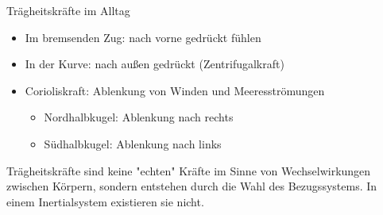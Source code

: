 \begin{example2}{Trägheitskräfte im Alltag}
    \begin{itemize}
        \item Im bremsenden Zug: nach vorne gedrückt fühlen
        \item In der Kurve: nach außen gedrückt (Zentrifugalkraft)
        \item Corioliskraft: Ablenkung von Winden und Meeresströmungen
        \begin{itemize}
            \item Nordhalbkugel: Ablenkung nach rechts
            \item Südhalbkugel: Ablenkung nach links
        \end{itemize}
    \end{itemize}
\end{example2}

\begin{remark}
    Trägheitskräfte sind keine "echten" Kräfte im Sinne von Wechselwirkungen zwischen Körpern, sondern entstehen durch die Wahl des Bezugssystems. In einem Inertialsystem existieren sie nicht.
\end{remark}